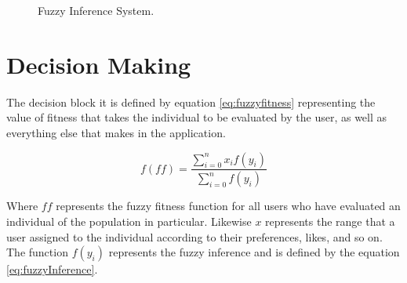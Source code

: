 \begin{figure}
\captionsetup{justification=centering,margin=2cm}
\centering
\setlength\fboxsep{0pt}
\setlength\fboxrule{0.7pt}
\caption{Fuzzy Inference System.}
\label{fig:Fuzzy}       
\end{figure}


\section{Decision Making}
The decision block it is defined by equation \ref{eq:fuzzyfitness} representing the value of fitness that takes the individual to be evaluated by the user, as well as everything else that makes in the application.

\begin{equation}\label{eq:fuzzyfitness}
\displaystyle f(ff)=\frac{\sum_{i=0}^{n}x_{i}f(y_{i})}{\sum_{i=0}^{n}f(y_{i})}
\end{equation}

Where  $ff$ represents the fuzzy fitness function for all users who have evaluated an individual of the population in particular.
Likewise $x$ represents the range that a user assigned to the individual according to their preferences, likes, and so on. The function $f(y_i)$ represents the fuzzy inference and is defined by the equation \ref{eq:fuzzyInference}.

